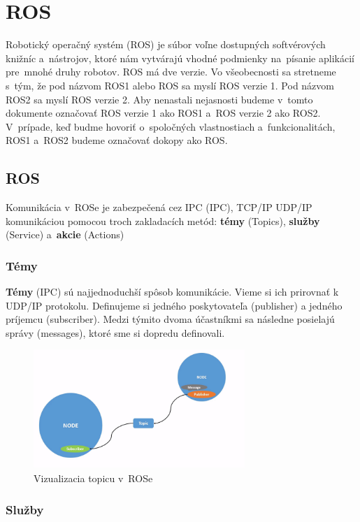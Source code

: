 \section{ROS}
\noindent Robotický operačný systém (\acrlong{ROS}) je súbor voľne dostupných softvérových knižníc a~nástrojov, ktoré nám vytvárajú
vhodné podmienky na~písanie aplikácií pre~mnohé druhy robotov. ROS má dve verzie. Vo všeobecnosti sa stretneme s~tým, že pod názvom
ROS1 alebo ROS sa myslí ROS verzie 1. Pod názvom ROS2 sa myslí ROS verzie 2. Aby nenastali nejasnosti budeme v~tomto dokumente
označovať ROS verzie 1 ako ROS1 a~ROS verzie 2 ako ROS2. V~prípade, keď budme hovoriť o~spoločných vlastnostiach a~funkcionalitách,
ROS1 a~ROS2 budeme označovať dokopy ako ROS.

\subsection{ROS}

\noindent Komunikácia v~ROSe je zabezpečená cez IPC (\acrlong{IPC}), TCP/IP UDP/IP komunikáciou pomocou troch zakladacích metód:
\textbf{témy} (Topics), \textbf{služby} (Service) a~\textbf{akcie} (Actions)

\subsubsection{Témy}

\textbf {Témy} (IPC) sú najjednoduchší spôsob komunikácie. Vieme si ich prirovnať k UDP/IP protokolu. Definujeme si jedného poskytovateľa (publisher)
a jedného príjemcu (subscriber). Medzi týmito dvoma účastníkmi sa následne posielajú správy (messages), ktoré sme si dopredu definovali.

\begin{figure}[h]
	\centering
	\includegraphics[width=8cm]{img/topicsExplanation.png}
	\caption{Vizualizacia topicu v~ROSe~\cite{RosDoc}}
	\label{fig:topics}
\end{figure}

\newpage
\subsubsection{Služby}

